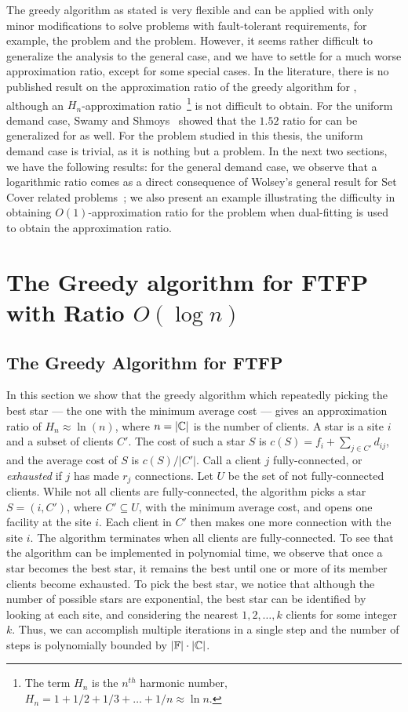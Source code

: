 \documentclass[oneside,final]{ucr}
\begin{document}
The greedy algorithm as stated is very flexible and can be
applied with only minor modifications to solve problems with
fault-tolerant requirements, for example, the {\FTFL}
problem and the {\FTFP} problem. However, it seems rather
difficult to generalize the analysis to the general case,
and we have to settle for a much worse approximation ratio,
except for some special cases. In the literature, there is
no published result on the approximation ratio of the greedy
algorithm for {\FTFL}, although an $H_n$-approximation
ratio~\footnote{The term $H_n$ is the $n^{th}$ harmonic
  number, $H_n = 1 + 1/2 + 1/3 + \ldots + 1/n \approx \ln
  n$.} is not difficult to obtain. For the uniform demand
case, Swamy and Shmoys~\cite{SwamyS08} showed that the
$1.52$ ratio for {\UFL} can be generalized for {\FTFL} as
well. For the {\FTFP} problem studied in this thesis, the
uniform demand case is trivial, as it is nothing but a
{\UFL} problem. In the next two sections, we have the
following results: for the general demand case, we observe
that a logarithmic ratio comes as a direct consequence of
Wolsey's general result for Set Cover related
problems~\cite{Wolsey88}; we also present an example
illustrating the difficulty in obtaining
$O(1)$-approximation ratio for the {\FTFP} problem when
dual-fitting is used to obtain the approximation ratio.

\section{The Greedy algorithm for FTFP with Ratio $O(\log n)$}
\label{sec: greedy_ratio}

\subsection{The Greedy Algorithm for FTFP}
In this section we show that the greedy algorithm which
repeatedly picking the best star --- the one with the
minimum average cost --- gives an approximation ratio of
$H_n \approx \ln(n)$, where $n=|\mathbb{C}|$ is the number
of clients. A star is a site $i$ and a subset of clients
$C'$. The cost of such a star $S$ is $c(S) = f_i +
\sum_{j\in C'} d_{ij}$, and the average cost of $S$ is $c(S)
/ |C'|$. Call a client $j$ fully-connected, or
\emph{exhausted} if $j$ has made $r_j$ connections. Let $U$
be the set of not fully-connected clients. While not all
clients are fully-connected, the algorithm picks a star
$S=(i,C')$, where $C' \subseteq U$, with the minimum average
cost, and opens one facility at the site $i$. Each client in
$C'$ then makes one more connection with the site $i$. The
algorithm terminates when all clients are
fully-connected. To see that the algorithm can be
implemented in polynomial time, we observe that once a star
becomes the best star, it remains the best until one or more
of its member clients become exhausted. To pick the best
star, we notice that although the number of possible stars
are exponential, the best star can be identified by looking
at each site, and considering the nearest $1,2,\ldots,k$
clients for some integer $k$. Thus, we can accomplish
multiple iterations in a single step and the number of steps
is polynomially bounded by $|\mathbb{F}|\cdot|\mathbb{C}|$.
\end{document}

